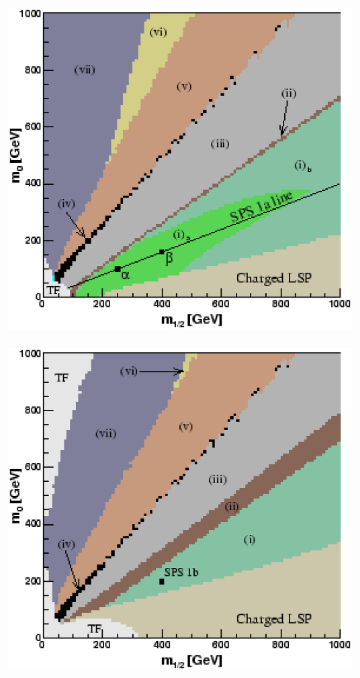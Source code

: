\documentclass[twoside,english]{uiofysmaster}
\begin{document}
\begin{figure}[hbt]
\centering
\begin{subfigure}[b]{0.4\textwidth}
	\includegraphics[width=1\textwidth]{figures/susyintro/scan_sps1a.eps}
	\caption{ }
	\label{fig:mSUGRA_decay_spectrum_a}
\end{subfigure}
\begin{subfigure}[b]{0.4\textwidth}
	\includegraphics[width=1\textwidth]{figures/susyintro/scan_sps1b.eps}
	\caption{ }
	\label{fig:mSUGRA_decay_spectrum_b}
\end{subfigure}


\end{figure}
\end{document}

